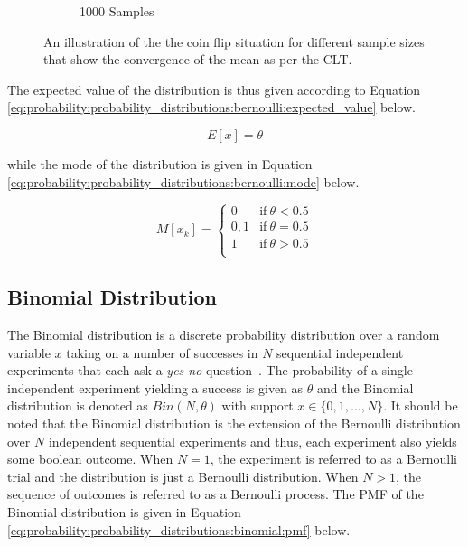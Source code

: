 \begin{figure}[htbp]
\begin{subfigure}{0.49\textwidth}
            \caption{1000 Samples}
            \label{fig:probability:probability_distributions:bernoulli:coin_1000}
      \end{subfigure}
      \par\bigskip
      \caption{An illustration of the the coin flip situation for different sample sizes that show the convergence of the mean as per the \ac{CLT}.}
      \label{fig:probability:probability_distributions:bernoulli:coin}
\end{figure}

The expected value of the distribution is thus given according to Equation \ref{eq:probability:probability_distributions:bernoulli:expected_value} below.

\begin{equation}
      \label{eq:probability:probability_distributions:bernoulli:expected_value}
      E[x] = \theta
\end{equation}

while the mode of the distribution is given in Equation \ref{eq:probability:probability_distributions:bernoulli:mode} below.

\begin{equation}
      \label{eq:probability:probability_distributions:bernoulli:mode}
      M[x_{k}] =
      \begin{cases}
            0   & \text{if}\ \theta < 0.5 \\
            0,1 & \text{if}\ \theta = 0.5 \\
            1   & \text{if}\ \theta > 0.5 \\
      \end{cases}
\end{equation}




\subsection{Binomial Distribution}
\label{sec:probability:probability_distributions:bin}


The Binomial distribution is a discrete probability distribution over a random variable $x$ taking on a number of successes in $N$ sequential independent experiments that each ask a \textit{yes-no} question~\cite{ref:wackerly:2014}. The probability of a single independent experiment yielding a success is given as $\theta$ and the Binomial distribution is denoted as $Bin(N, \theta)$ with support $x \in \{0, 1, \dots, N\}$.  It should be noted that the Binomial distribution is the extension of the Bernoulli distribution over $N$ independent sequential experiments and thus, each experiment also yields some boolean outcome. When $N=1$, the experiment is referred to as a Bernoulli trial and the distribution is just a Bernoulli distribution. When $N > 1$, the sequence of outcomes is referred to as a Bernoulli process. The \ac{PMF} of the Binomial distribution is given in Equation \ref{eq:probability:probability_distributions:binomial:pmf} below.

